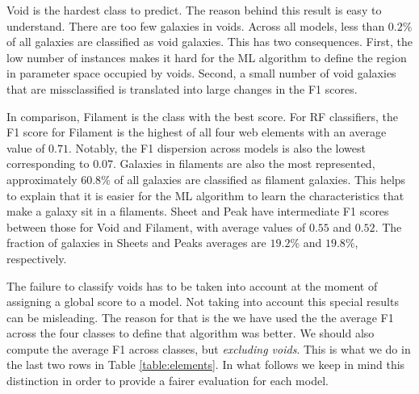 \documentclass[usenatbib]{mnras}
\begin{document}
Void is the hardest class to predict. 
The reason behind this result is easy to understand. 
There are too few galaxies in voids.
Across all models, less than $0.2\%$ of all galaxies
are classified as void galaxies.
This has two consequences.
First, the low number of instances makes it hard for the ML algorithm to
define the region in parameter space occupied by voids.
Second, a small number of void galaxies that are missclassified is
translated into large changes in the F1 scores.

In comparison, Filament is the class with the best score.
For RF classifiers, the F1 score for Filament is the highest of all four
web elements with an average value of  $0.71$.
Notably, the F1 dispersion across models is also the lowest
corresponding to $0.07$.
Galaxies in filaments are also the most represented,
approximately $60.8\%$ of all galaxies are classified as filament galaxies.
This helps to explain that it is easier for the ML algorithm to learn
the characteristics that make a galaxy sit in a filaments.
Sheet and Peak have intermediate F1 scores between
those for Void and Filament, with average values of $0.55$ and $0.52$.
The fraction of galaxies in Sheets and Peaks averages are $19.2\%$ and $19.8\%$, respectively. 

The failure to classify voids has to be taken into account at the
moment of assigning a global score to a model.
Not taking into account this special results can be misleading.
The reason for that is the we have used the the average F1 across the
four classes to define that algorithm was better. 
We should also compute the average F1 across classes, but
\emph{excluding voids}.
This is what we do in the last two rows in Table \ref{table:elements}.
In what follows we keep in mind this distinction in order to provide a
fairer evaluation for each model.
\end{document}
